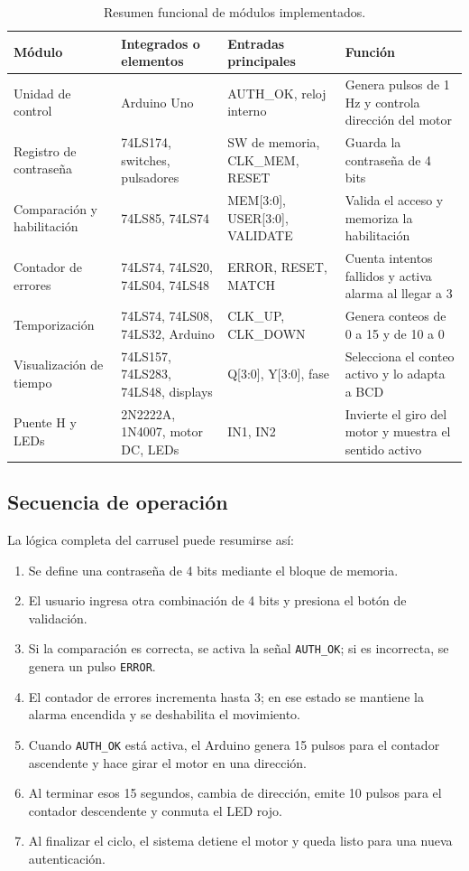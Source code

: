 \documentclass[12pt,a4paper]{article}
\begin{document}
\begin{table}[H]
    \centering
    \caption{Resumen funcional de módulos implementados.}
    \small
    \begin{tabular}{p{3.2cm}p{3.4cm}p{3.2cm}p{4.2cm}}
        \toprule
        \textbf{Módulo} & \textbf{Integrados o elementos} & \textbf{Entradas principales} & \textbf{Función} \\
        \midrule
        Unidad de control & Arduino Uno & AUTH\_OK, reloj interno & Genera pulsos de 1 Hz y controla dirección del motor \\
        Registro de contraseña & 74LS174, switches, pulsadores & SW de memoria, CLK\_MEM, RESET & Guarda la contraseña de 4 bits \\
        Comparación y habilitación & 74LS85, 74LS74 & MEM[3:0], USER[3:0], VALIDATE & Valida el acceso y memoriza la habilitación \\
        Contador de errores & 74LS74, 74LS20, 74LS04, 74LS48 & ERROR, RESET, MATCH & Cuenta intentos fallidos y activa alarma al llegar a 3 \\
        Temporización & 74LS74, 74LS08, 74LS32, Arduino & CLK\_UP, CLK\_DOWN & Genera conteos de 0 a 15 y de 10 a 0 \\
        Visualización de tiempo & 74LS157, 74LS283, 74LS48, displays & Q[3:0], Y[3:0], fase & Selecciona el conteo activo y lo adapta a BCD \\
        Puente H y LEDs & 2N2222A, 1N4007, motor DC, LEDs & IN1, IN2 & Invierte el giro del motor y muestra el sentido activo \\
        \bottomrule
    \end{tabular}
\end{table}

\subsection{Secuencia de operación}
La lógica completa del carrusel puede resumirse así:
\begin{enumerate}
    \item Se define una contraseña de 4 bits mediante el bloque de memoria.
    \item El usuario ingresa otra combinación de 4 bits y presiona el botón de validación.
    \item Si la comparación es correcta, se activa la señal \texttt{AUTH\_OK}; si es incorrecta, se genera un pulso \texttt{ERROR}.
    \item El contador de errores incrementa hasta 3; en ese estado se mantiene la alarma encendida y se deshabilita el movimiento.
    \item Cuando \texttt{AUTH\_OK} está activa, el Arduino genera 15 pulsos para el contador ascendente y hace girar el motor en una dirección.
    \item Al terminar esos 15 segundos, cambia de dirección, emite 10 pulsos para el contador descendente y conmuta el LED rojo.
    \item Al finalizar el ciclo, el sistema detiene el motor y queda listo para una nueva autenticación.
\end{enumerate}
\end{document}
